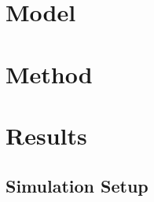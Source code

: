 \documentclass{article}
\begin{document}

\section{Model}
 

\section{Method}

\section{Results}
  \subsection{Simulation Setup}
\end{document}
